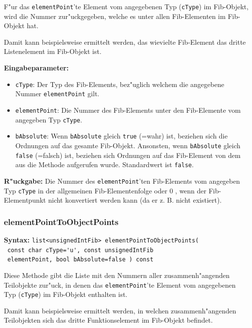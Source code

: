\bigskip\noindent
F"ur das \verb|elementPoint|'te Element vom angegebenen Typ (\verb|cType|) im Fib-Objekt, wird die Nummer zur"uckgegeben, welche es unter allen Fib-Elementen im Fib-Objekt hat.

Damit kann beispielsweise ermittelt werden, das wievielte Fib-Element das dritte Listenelement im Fib-Objekt ist.

\bigskip\noindent
\textbf{Eingabeparameter:}
\begin{itemize}
 \item \verb|cType|: Der Typ des Fib-Elements, bez"uglich welchem die angegebene Nummer \verb|elementPoint| gilt.
 \item \verb|elementPoint|: Die Nummer des Fib-Elements unter den Fib-Elemente vom angegeben Typ \verb|cType|.
 \item \verb|bAbsolute|: Wenn \verb|bAbsolute| gleich \verb|true| (=wahr) ist, beziehen sich die Ordnungen auf das gesamte Fib-Objekt. Ansonsten, wenn \verb|bAbsolute| gleich \verb|false| (=falsch) ist, beziehen sich Ordnungen auf das Fib-Element von dem aus die Methode aufgerufen wurde. Standardwert ist \verb|false|.
\end{itemize}

\bigskip\noindent
\textbf{R"uckgabe:} Die Nummer des \verb|elementPoint|'ten Fib-Elements vom angegeben Typ \verb|cType| in der allgemeinen Fib-Elementenfolge oder $0$ , wenn der Fib-Elementpunkt nicht konvertiert werden kann (da er z. B. nicht existiert).


\subsubsection{elementPointToObjectPoints}

\textbf{Syntax:} \verb|list<unsignedIntFib> elementPointToObjectPoints( | \\\verb| const char cType='u', const unsignedIntFib| \\\verb| elementPoint, bool bAbsolute=false ) const|

\bigskip\noindent
Diese Methode gibt die Liste mit den Nummern aller zusammenh"angenden Teilobjekte zur"uck, in denen das \verb|elementPoint|'te Element vom angegebenen Typ (\verb|cType|) im Fib-Objekt enthalten ist.

Damit kann beispielsweise ermittelt werden, in welchen zusammenh"angenden Teilobjekten sich das dritte Funktionselement im Fib-Objekt befindet.

